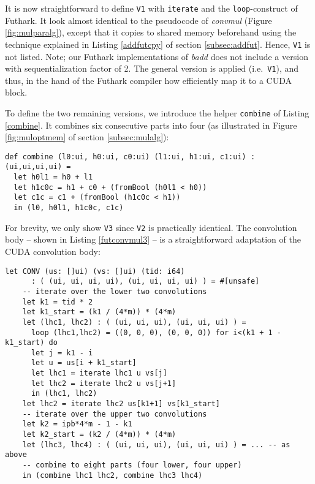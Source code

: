 It is now straightforward to define \texttt{V1} with \texttt{iterate} and the
\texttt{loop}-construct of Futhark. It look almost identical to the pseudocode
of \textit{convmul} (Figure \ref{fig:mulparalg}), except that it copies to
shared memory beforehand using the technique explained in Listing
\ref{addfutcpy} of section \ref{subsec:addfut}. Hence, \texttt{V1} is not
listed. Note; our Futhark implementations of \textit{badd} does not include a
version with sequentialization factor of 2. The general version is applied
(i.e.\ \texttt{V1}), and thus, in the hand of the Futhark compiler how
efficiently map it to a CUDA block.

To define the two remaining versions, we introduce the helper \texttt{combine}
of Listing \ref{combine}. It combines six consecutive parts into four (as
illustrated in Figure \ref{fig:muloptmem} of section \ref{subsec:mulalg}):
\begin{lstlisting}[language=futhark,caption={\footnotesize Futhark function to combine the parts of two consecutive convolutions from file \texttt{mul.fut}.},label={combine},firstnumber=26]
def combine (l0:ui, h0:ui, c0:ui) (l1:ui, h1:ui, c1:ui) : (ui,ui,ui,ui) =
  let h0l1 = h0 + l1
  let h1c0c = h1 + c0 + (fromBool (h0l1 < h0))
  let c1c = c1 + (fromBool (h1c0c < h1))
  in (l0, h0l1, h1c0c, c1c)
\end{lstlisting}

For brevity, we only show \texttt{V3} since \texttt{V2} is practically
identical. The convolution body -- shown in Listing \ref{futconvmul3} -- is a
straightforward adaptation of the CUDA convolution body:

\begin{lstlisting}[language=futhark,caption={\footnotesize Futhark \textit{convmul} \texttt{V3} convolution function on thread-basis in from file \texttt{mul.fut} (slightly edited).},label={futconvmul3},gobble=2,firstnumber=154]
  let CONV (us: []ui) (vs: []ui) (tid: i64)
      : ( (ui, ui, ui, ui), (ui, ui, ui, ui) ) = #[unsafe]
    -- iterate over the lower two convolutions
    let k1 = tid * 2
    let k1_start = (k1 / (4*m)) * (4*m)
    let (lhc1, lhc2) : ( (ui, ui, ui), (ui, ui, ui) ) =
      loop (lhc1,lhc2) = ((0, 0, 0), (0, 0, 0)) for i<(k1 + 1 - k1_start) do
      let j = k1 - i
      let u = us[i + k1_start]
      let lhc1 = iterate lhc1 u vs[j]
      let lhc2 = iterate lhc2 u vs[j+1]
      in (lhc1, lhc2)
    let lhc2 = iterate lhc2 us[k1+1] vs[k1_start]
    -- iterate over the upper two convolutions
    let k2 = ipb*4*m - 1 - k1
    let k2_start = (k2 / (4*m)) * (4*m)
    let (lhc3, lhc4) : ( (ui, ui, ui), (ui, ui, ui) ) = ... -- as above
    -- combine to eight parts (four lower, four upper)
    in (combine lhc1 lhc2, combine lhc3 lhc4)
\end{lstlisting}

